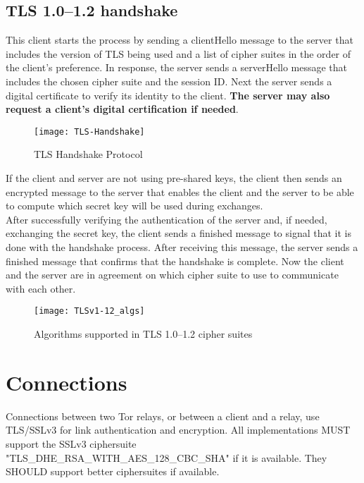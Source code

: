 \subsection{TLS 1.0–1.2 handshake}

This client starts the process by sending a clientHello message to the server that includes the version of TLS being used and a list of cipher suites in the order of the client’s preference. In response, the server sends a serverHello message that includes the chosen cipher suite and the session ID. Next the server sends a digital certificate to verify its identity to the client. \textbf{The server may also request a client’s digital certification if needed}.\cite{ciphersuit-wiki}

\begin{figure}[!h]
\centering\texttt{[image: TLS-Handshake]}
\caption{TLS Handshake Protocol \cite{TLS-meduim}}
\label{fig:TLS_Proto} %
\end{figure}


If the client and server are not using pre-shared keys, the client then sends an encrypted message to the server that enables the client and the server to be able to compute which secret key will be used during exchanges.\cite{ciphersuit-wiki}
\\
After successfully verifying the authentication of the server and, if needed, exchanging the secret key, the client sends a finished message to signal that it is done with the handshake process. After receiving this message, the server sends a finished message that confirms that the handshake is complete. Now the client and the server are in agreement on which cipher suite to use to communicate with each other.\cite{ciphersuit-wiki}


\begin{figure}[!h]
\centering\texttt{[image: TLSv1-12\_algs]}
\caption{Algorithms supported in TLS 1.0–1.2 cipher suites \cite{ciphersuit-wiki}}
\label{fig:TLS_algs} %
\end{figure}

\section{Connections}

Connections between two Tor relays, or between a client and a relay, use TLS/SSLv3 for link authentication and encryption. All implementations MUST support the SSLv3 ciphersuite\\ "TLS\_DHE\_RSA\_WITH\_AES\_128\_CBC\_SHA" if it is available. They SHOULD support better ciphersuites if available.
\\

